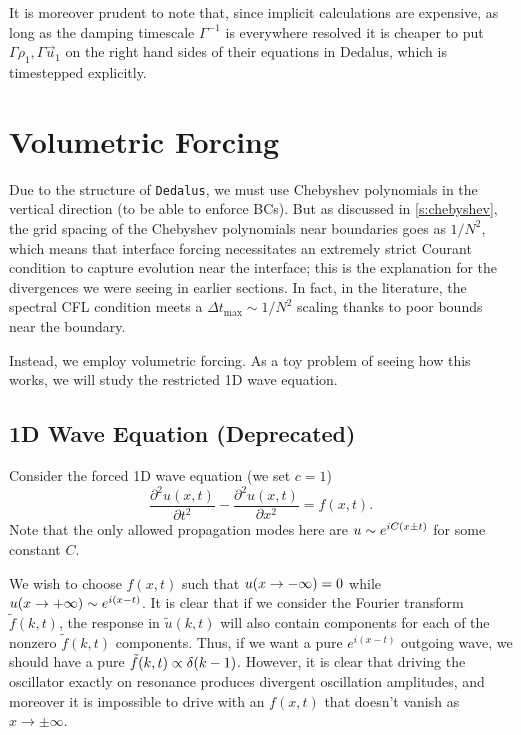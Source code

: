 \documentclass[11pt,
        usenames, %
        dvipsnames %
    ]{report}
\newcommand*{\ptd}[2]{\frac{\partial^2 #1}{\partial#2^2}}
\DeclarePairedDelimiter\p{\lparen}{\rparen}
\begin{document}
It is moreover prudent to note that, since implicit calculations are expensive,
as long as the damping timescale $\Gamma^{-1}$ is everywhere resolved it is
cheaper to put $\Gamma \rho_1, \Gamma \vec{u}_1$ on the right hand sides of
their equations in Dedalus, which is timestepped explicitly.

\section{Volumetric Forcing}

Due to the structure of \lstinline{Dedalus}, we must use Chebyshev polynomials
in the vertical direction (to be able to enforce BCs). But as discussed in
\autoref{s:chebyshev}, the grid spacing of the Chebyshev polynomials near
boundaries goes as $1/N^2$, which means that interface forcing necessitates an
extremely strict Courant condition to capture evolution near the interface; this
is the explanation for the divergences we were seeing in earlier sections. In
fact, in the literature, the spectral CFL condition meets a $\Delta t_{\max}
\sim 1/N^2$ scaling thanks to poor bounds near the boundary.

Instead, we employ volumetric forcing. As a toy problem of seeing how this
works, we will study the restricted 1D wave equation.

\subsection{1D Wave Equation (Deprecated)}

Consider the forced 1D wave equation (we set $c = 1$)
\begin{equation}
    \ptd{u(x, t)}{t} - \ptd{u(x, t)}{x} = f(x, t).
\end{equation}
Note that the only allowed propagation modes here are $u \sim e^{iC\p*{x \pm
t}}$ for some constant $C$.

We wish to choose $f(x, t)$ such that $u\p*{x \to -\infty} = 0$ while $u\p*{x
\to +\infty} \sim e^{i\p*{x - t}}$. It is clear that if we consider the Fourier
transform $\tilde{f}(k, t)$, the response in $\tilde{u}(k, t)$ will also contain
components for each of the nonzero $\tilde{f}(k, t)$ components. Thus, if we
want a pure $e^{i(x - t)}$ outgoing wave, we should have a pure $\tilde{f}(k, t)
\propto \delta\p*{k - 1}$. However, it is clear that driving the oscillator
exactly on resonance produces divergent oscillation amplitudes, and moreover it
is impossible to drive with an $f(x, t)$ that doesn't vanish as $x \to \pm
\infty$.
\end{document}
